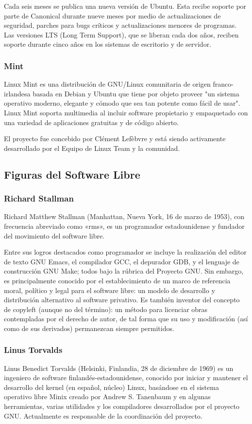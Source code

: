 Cada seis meses se publica una nueva versión de Ubuntu. Esta recibe soporte por parte de Canonical durante nueve meses por medio de actualizaciones de seguridad, parches para bugs críticos y actualizaciones menores de programas. Las versiones LTS (Long Term Support), que se liberan cada dos años, reciben soporte durante cinco años en los sistemas de escritorio y de servidor.

\subsubsection{Mint}
Linux Mint es una distribución de GNU/Linux comunitaria de origen franco-irlandesa basada en Debian y Ubuntu que tiene por objeto proveer "un sistema operativo moderno, elegante y cómodo que sea tan potente como fácil de usar". Linux Mint soporta multimedia al incluir software propietario y empaquetado con una variedad de aplicaciones gratuitas y de código abierto.

El proyecto fue concebido por Clément Lefèbvre y está siendo activamente desarrollado por el Equipo de Linux Team y la comunidad.

\subsection{Figuras del Software Libre}

\subsubsection{Richard Stallman}
Richard Matthew Stallman (Manhattan, Nueva York, 16 de marzo de 1953), con frecuencia abreviado como «rms», es un programador estadounidense y fundador del movimiento del software libre.

Entre sus logros destacados como programador se incluye la realización del editor de texto GNU Emacs, el compilador GCC, el depurador GDB, y el lenguaje de construcción GNU Make; todos bajo la rúbrica del Proyecto GNU. Sin embargo, es principalmente conocido por el establecimiento de un marco de referencia moral, político y legal para el software libre: un modelo de desarrollo y distribución alternativo al software privativo. Es también inventor del concepto de copyleft (aunque no del término): un método para licenciar obras contempladas por el derecho de autor, de tal forma que su uso y modificación (así como de sus derivados) permanezcan siempre permitidos.

\subsubsection{Linus Torvalds}
Linus Benedict Torvalds (Helsinki, Finlandia, 28 de diciembre de 1969) es un ingeniero de software finlandés-estadounidense, conocido por iniciar y mantener el desarrollo del kernel (en español, núcleo) Linux, basándose en el sistema operativo libre Minix creado por Andrew S. Tanenbaum y en algunas herramientas, varias utilidades y los compiladores desarrollados por el proyecto GNU. Actualmente es responsable de la coordinación del proyecto.

